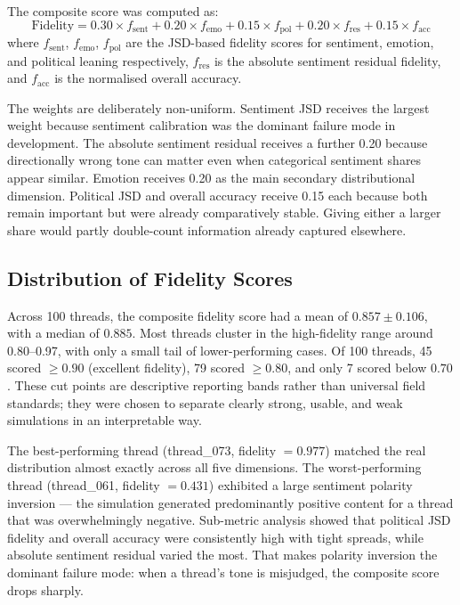 \documentclass[logo,bsc,singlespacing,parskip,online]{infthesis}
\begin{document}
The composite score was computed as:
\begin{equation}
\text{Fidelity} = 0.30 \times f_{\text{sent}} + 0.20 \times f_{\text{emo}} + 0.15 \times f_{\text{pol}} + 0.20 \times f_{\text{res}} + 0.15 \times f_{\text{acc}}
\end{equation}
where $f_{\text{sent}}$, $f_{\text{emo}}$, $f_{\text{pol}}$ are the JSD-based fidelity scores for sentiment, emotion, and political leaning respectively, $f_{\text{res}}$ is the absolute sentiment residual fidelity, and $f_{\text{acc}}$ is the normalised overall accuracy.

The weights are deliberately non-uniform. Sentiment JSD receives the largest weight because sentiment calibration was the dominant failure mode in development. The absolute sentiment residual receives a further 0.20 because directionally wrong tone can matter even when categorical sentiment shares appear similar. Emotion receives 0.20 as the main secondary distributional dimension. Political JSD and overall accuracy receive 0.15 each because both remain important but were already comparatively stable. Giving either a larger share would partly double-count information already captured elsewhere.

\subsection{Distribution of Fidelity Scores}

Across 100 threads, the composite fidelity score had a mean of $0.857 \pm 0.106$, with a median of $0.885$. Most threads cluster in the high-fidelity range around 0.80--0.97, with only a small tail of lower-performing cases. Of 100 threads, 45 scored $\geq 0.90$ (excellent fidelity), 79 scored $\geq 0.80$, and only 7 scored below $0.70$. These cut points are descriptive reporting bands rather than universal field standards; they were chosen to separate clearly strong, usable, and weak simulations in an interpretable way.

The best-performing thread (thread\_073, fidelity $= 0.977$) matched the real distribution almost exactly across all five dimensions. The worst-performing thread (thread\_061, fidelity $= 0.431$) exhibited a large sentiment polarity inversion --- the simulation generated predominantly positive content for a thread that was overwhelmingly negative. Sub-metric analysis showed that political JSD fidelity and overall accuracy were consistently high with tight spreads, while absolute sentiment residual varied the most. That makes polarity inversion the dominant failure mode: when a thread's tone is misjudged, the composite score drops sharply.
\end{document}
